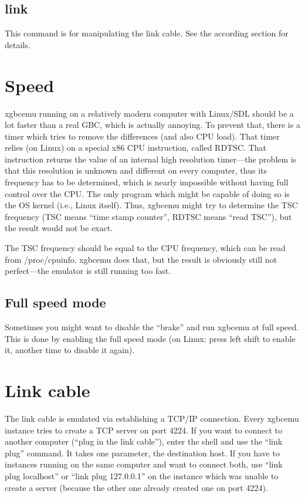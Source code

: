 \documentclass[fleqn,english,openany]{scrbook}
\begin{document}
\subsection{link}

This command is for manipulating the link cable. See the according section for details.


\section{Speed}

xgbcemu running on a relatively modern computer with Linux/SDL should be a lot faster than a real GBC, which is actually
annoying. To prevent that, there is a timer which tries to remove the differences (and also CPU load). That timer relies
(on Linux) on a special x86 CPU instruction, called RDTSC. That instruction returns the value of an internal high
resolution timer---the problem is that this resolution is unknown and different on every computer, thus its frequency has
to be determined, which is nearly impossible without having full control over the CPU. The only program which might be
capable of doing so is the OS kernel (i.e., Linux itself). Thus, xgbcemu might try to determine the TSC frequency (TSC
means “time stamp counter”, RDTSC means “read TSC”), but the result would not be exact.

The TSC frequency should be equal to the CPU frequency, which can be read from /proc/cpuinfo. xgbcemu does that, but the
result is obviously still not perfect---the emulator is still running too fast.

\subsection{Full speed mode}

Sometimes you might want to disable the “brake” and run xgbcemu at full speed. This is done by enabling the full speed
mode (on Linux: press left shift to enable it, another time to disable it again).


\section{Link cable}

The link cable is emulated via establishing a TCP/IP connection. Every xgbcemu instance tries to create a TCP server on
port 4224. If you want to connect to another computer (“plug in the link cable”), enter the shell and use the “link plug”
command. It takes one parameter, the destination host. If you have to instances running on the same computer and want to
connect both, use “link plug localhost” or “link plug 127.0.0.1” on the instance which was unable to create a server
(because the other one already created one on port 4224).
\end{document}
